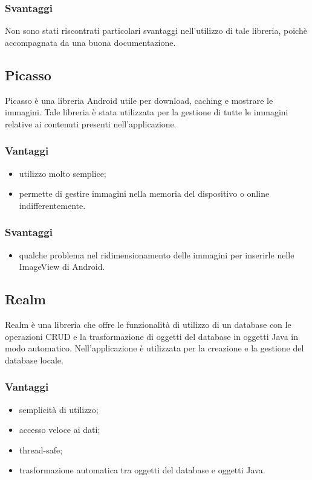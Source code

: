 \documentclass[../Tesi.tex]{subfiles}
\begin{document}
		\subsubsection{Svantaggi}
			Non sono stati riscontrati particolari svantaggi nell'utilizzo di tale libreria, poichè accompagnata da una buona documentazione.

	\subsection{Picasso}
		Picasso è una libreria Android utile per download, caching e mostrare le immagini. Tale libreria è stata utilizzata per la gestione di tutte le immagini relative ai contenuti presenti nell'applicazione.
		\subsubsection{Vantaggi}
			\begin{itemize}
				\item utilizzo molto semplice;
				\item permette di gestire immagini nella memoria del dispositivo o online indifferentemente.
			\end{itemize}
		\subsubsection{Svantaggi}
			\begin{itemize}
				\item qualche problema nel ridimensionamento delle immagini per inserirle nelle ImageView di Android.
			\end{itemize}


	\subsection{Realm}
		Realm è una libreria che offre le funzionalità di utilizzo di un database con le operazioni CRUD e la trasformazione di oggetti del database in oggetti Java in modo automatico. Nell'applicazione è utilizzata per la creazione e la gestione del database locale.
		\subsubsection{Vantaggi}
			\begin{itemize}
				\item semplicità di utilizzo;
				\item accesso veloce ai dati;
				\item thread-safe;
				\item trasformazione automatica tra oggetti del database e oggetti Java.
			\end{itemize}
\end{document}
